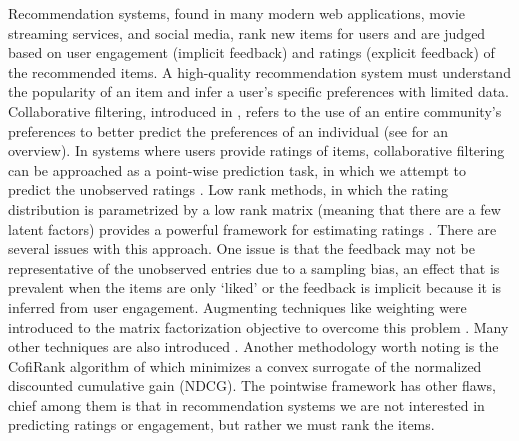 \documentclass{article}
\begin{document}
Recommendation systems, found in many modern web applications, movie streaming services, and social media, rank new items for users and are judged based on user engagement (implicit feedback) and ratings (explicit feedback) of the recommended items.
A high-quality recommendation system must understand the popularity of an item and infer a user's specific preferences with limited data. 
Collaborative filtering, introduced in \cite{hill1995recommending}, refers to the use of an entire community's preferences to better predict the preferences of an individual (see \cite{schafer2007collaborative} for an overview).
In systems where users provide ratings of items, collaborative filtering can be approached as a point-wise prediction task, in which we attempt to predict the unobserved ratings \cite{pan2017transfer}.
Low rank methods, in which the rating distribution is parametrized by a low rank matrix (meaning that there are a few latent factors) provides a powerful framework for estimating ratings \cite{mnih2008probabilistic, koren2008factorization}.
There are several issues with this approach.
One issue is that the feedback may not be representative of the unobserved entries due to a sampling bias, an effect that is prevalent when the items are only `liked' or the feedback is implicit because it is inferred from user engagement.
Augmenting techniques like weighting were introduced to the matrix factorization objective to overcome this problem \cite{hsieh2015pu, hu2008collaborative}. Many other techniques are also introduced \cite{kabbur2013fism, wang2017irgan, wu2016collaborative}.
Another methodology worth noting is the CofiRank algorithm of \cite{weimer2008cofi} which minimizes a convex surrogate of the normalized discounted cumulative gain (NDCG).
The pointwise framework has other flaws, chief among them is that in recommendation systems we are not interested in predicting ratings or engagement, but rather we must rank the items. 
\end{document}
